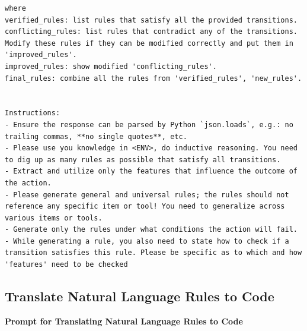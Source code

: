 \documentclass{article} %
\begin{document}
\begin{lstlisting}
where
verified_rules: list rules that satisfy all the provided transitions.
conflicting_rules: list rules that contradict any of the transitions. Modify these rules if they can be modified correctly and put them in 'improved_rules'.
improved_rules: show modified 'conflicting_rules'.
final_rules: combine all the rules from 'verified_rules', 'new_rules'.


Instructions:
- Ensure the response can be parsed by Python `json.loads`, e.g.: no trailing commas, **no single quotes**, etc.
- Please use you knowledge in <ENV>, do inductive reasoning. You need to dig up as many rules as possible that satisfy all transitions.
- Extract and utilize only the features that influence the outcome of the action.
- Please generate general and universal rules; the rules should not reference any specific item or tool! You need to generalize across various items or tools.
- Generate only the rules under what conditions the action will fail.
- While generating a rule, you also need to state how to check if a transition satisfies this rule. Please be specific as to which and how 'features' need to be checked
\end{lstlisting}

\subsection{Translate Natural Language Rules to Code }
\label{sec:Translate Natural Language Rules to Code}


\begin{center}
    \textbf{Prompt for Translating Natural Language Rules to Code}
\end{center}
\end{document}
